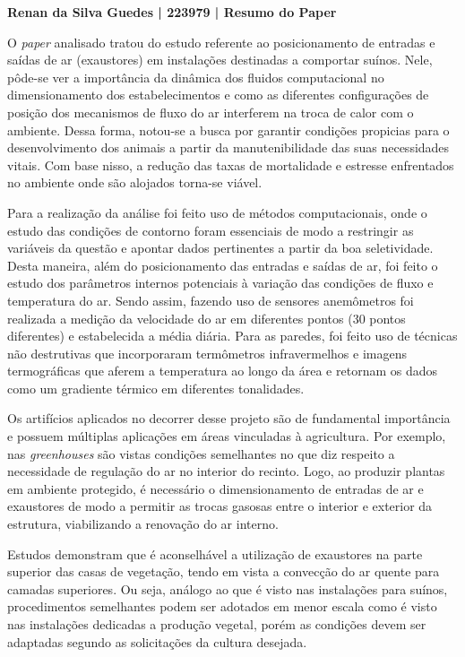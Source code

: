 \documentclass[a4paper, 12pt]{article}
\begin{document}
	\noindent\textbf{Renan da Silva Guedes | 223979 | Resumo do Paper}
	
	\vspace{.5cm}
	O \textit{paper} analisado tratou do estudo referente ao posicionamento de entradas e saídas de ar (exaustores) em instalações destinadas a comportar suínos. Nele, pôde-se ver a importância da dinâmica dos fluidos computacional no dimensionamento dos estabelecimentos e como as diferentes configurações de posição dos mecanismos de fluxo do ar interferem na troca de calor com o ambiente. Dessa forma, notou-se a busca por garantir condições propicias para o desenvolvimento dos animais a partir da manutenibilidade das suas necessidades vitais. Com base nisso, a redução das taxas de mortalidade e estresse enfrentados no ambiente onde são alojados torna-se viável.  
	
	Para a realização da análise foi feito uso de métodos computacionais, onde o estudo das condições de contorno foram essenciais de modo a restringir as variáveis da questão e apontar dados pertinentes a partir da boa seletividade. Desta maneira, além do posicionamento das entradas e saídas de ar, foi feito o estudo dos parâmetros internos potenciais à variação das condições de fluxo e temperatura do ar. Sendo assim, fazendo uso de sensores anemômetros foi realizada a medição da velocidade do ar em diferentes pontos (30 pontos diferentes) e estabelecida a média diária. Para as paredes, foi feito uso de técnicas não destrutivas que incorporaram termômetros infravermelhos e imagens termográficas que aferem a temperatura ao longo da área e retornam os dados como um gradiente térmico em diferentes tonalidades.
	
	Os artifícios aplicados no decorrer desse projeto são de fundamental importância e possuem múltiplas aplicações em áreas vinculadas à agricultura. Por exemplo, nas \textit{greenhouses} são vistas condições semelhantes no que diz respeito a necessidade de regulação do ar no interior do recinto. Logo, ao produzir plantas em ambiente protegido, é necessário o dimensionamento de entradas de ar e exaustores de modo a permitir as trocas gasosas entre o interior e exterior da estrutura, viabilizando a renovação do ar interno. 
	
	Estudos demonstram que é aconselhável a utilização de exaustores na parte superior das casas de vegetação, tendo em vista a convecção do ar quente para camadas superiores. Ou seja, análogo ao que é visto nas instalações para suínos, procedimentos semelhantes podem ser adotados em menor escala como é visto nas instalações dedicadas a produção vegetal, porém as condições devem ser adaptadas segundo as solicitações da cultura desejada.
	
\end{document}
